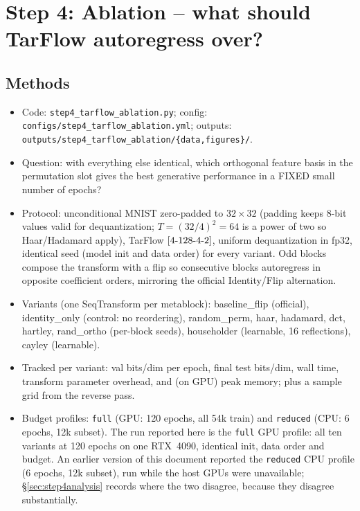 \documentclass[11pt]{article}
\begin{document}
\section{Step 4: Ablation -- what should TarFlow autoregress over?}

\subsection{Methods}
\begin{itemize}
  \item Code: \texttt{step4\_tarflow\_ablation.py}; config:
        \texttt{configs/step4\_tarflow\_ablation.yml}; outputs:
        \texttt{outputs/step4\_tarflow\_ablation/\{data,figures\}/}.
  \item Question: with everything else identical, which orthogonal feature
        basis in the permutation slot gives the best generative performance
        in a FIXED small number of epochs?
  \item Protocol: unconditional MNIST zero-padded to $32{\times}32$ (padding
        keeps 8-bit values valid for dequantization; $T=(32/4)^2=64$ is a
        power of two so Haar/Hadamard apply), TarFlow
        $[4\hbox{-}128\hbox{-}4\hbox{-}2]$, uniform dequantization in fp32,
        identical seed (model init and data order) for every variant. Odd
        blocks compose the transform with a flip so consecutive blocks
        autoregress in opposite coefficient orders, mirroring the official
        Identity/Flip alternation.
  \item Variants (one SeqTransform per metablock): baseline\_flip (official),
        identity\_only (control: no reordering), random\_perm, haar,
        hadamard, dct, hartley, rand\_ortho (per-block seeds), householder
        (learnable, 16 reflections), cayley (learnable).
  \item Tracked per variant: val bits/dim per epoch, final test bits/dim,
        wall time, transform parameter overhead, and (on GPU) peak memory;
        plus a sample grid from the reverse pass.
  \item Budget profiles: \texttt{full} (GPU: 120 epochs, all 54k train) and
        \texttt{reduced} (CPU: 6 epochs, 12k subset). The run reported here
        is the \texttt{full} GPU profile: all ten variants at 120 epochs on
        one RTX~4090, identical init, data order and budget. An earlier
        version of this document reported the \texttt{reduced} CPU profile
        (6 epochs, 12k subset), run while the host GPUs were unavailable;
        \S\ref{sec:step4analysis} records where the two disagree, because
        they disagree substantially.
\end{itemize}
\end{document}
